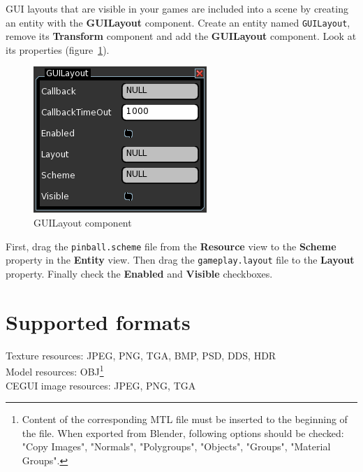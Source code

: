 \documentclass[a4paper,12pt]{article}
\begin{document}
GUI layouts that are visible in your games are included into a scene by creating an entity with the \textbf{GUILayout} component. Create an entity named \texttt{GUILayout}, remove its \textbf{Transform} component and add the \textbf{GUILayout} component. Look at its properties (figure~\ref{fig:guilayout_component}).

\begin{figure}[htb]
 \begin{center}
  \includegraphics[scale=0.65]{GUILayout}
 \end{center}
 \caption{GUILayout component}
 \label{fig:guilayout_component}
\end{figure}

First, drag the \texttt{pinball.scheme} file from the \textbf{Resource} view to the \textbf{Scheme} property in the \textbf{Entity} view. Then drag the \texttt{gameplay.layout} file to the \textbf{Layout} property. Finally check the \textbf{Enabled} and \textbf{Visible} checkboxes.




\section{Supported formats}
\label{sec:supported_formats}
Texture resources: JPEG, PNG, TGA, BMP, PSD, DDS, HDR \\
Model resources: OBJ\footnote{Content of the corresponding MTL file must be inserted to the beginning of the file. When exported from Blender, following options should be checked: "Copy Images", "Normals", "Polygroups", "Objects", "Groups", "Material Groups".} \\
CEGUI image resources: JPEG, PNG, TGA
\end{document}
